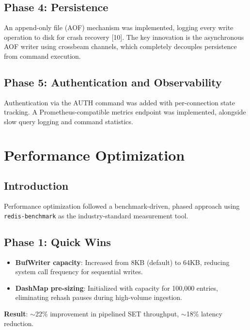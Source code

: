 \documentclass[12pt,a4paper]{report}
\begin{document}
\section{Phase 4: Persistence}

An append-only file (AOF) mechanism was implemented, logging every write operation to disk for crash recovery [10]. The key innovation is the asynchronous AOF writer using crossbeam channels, which completely decouples persistence from command execution.

\section{Phase 5: Authentication and Observability}

Authentication via the AUTH command was added with per-connection state tracking. A Prometheus-compatible metrics endpoint was implemented, alongside slow query logging and command statistics.

\chapter{Performance Optimization}

\section{Introduction}

Performance optimization followed a benchmark-driven, phased approach using \texttt{redis-benchmark} as the industry-standard measurement tool.

\section{Phase 1: Quick Wins}

\begin{itemize}[leftmargin=2.5em]
    \item \textbf{BufWriter capacity}: Increased from 8KB (default) to 64KB, reducing system call frequency for sequential writes.
    \item \textbf{DashMap pre-sizing}: Initialized with capacity for 100,000 entries, eliminating rehash pauses during high-volume ingestion.
\end{itemize}

\textbf{Result}: $\sim$22\% improvement in pipelined SET throughput, $\sim$18\% latency reduction.
\end{document}
